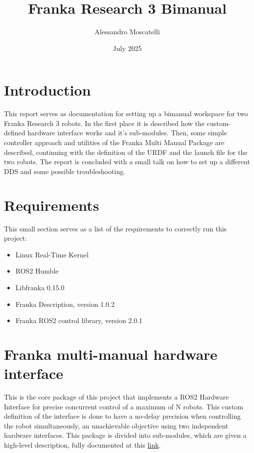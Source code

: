 \documentclass{article}
\title{Franka Research 3 Bimanual}
\author{Alessandro Moscatelli}
\date{July 2025}
\begin{document}
\maketitle

\section{Introduction}

This report serves as documentation for setting up a bimanual workspace for two Franka Research 3 robots. In the first place it is described how the custom-defined hardware interface works and it's sub-modules. Then, some simple controller approach and utilities of the Franka Multi Manual Package are described, continuing with the definition of the URDF and the launch file for the two robots. The report is concluded with a small talk on how to set up a different DDS and some possible troubleshooting.

\section{Requirements}
This small section serves as a list of the requirements to correctly run this project:
\begin{itemize}
    \item Linux Real-Time Kernel
    \item ROS2 Humble
    \item Libfranka 0.15.0
    \item Franka Description, version 1.0.2
    \item Franka ROS2 control library, version 2.0.1
\end{itemize}

\section{Franka multi-manual hardware interface}
This is the core package of this project that implements a ROS2 Hardware Interface for precise concurrent control of a maximum of N robots. This custom definition of the interface is done to have a no-delay precision when controlling the robot simultaneously, an unachievable objective using two independent hardware interfaces. This package is divided into sub-modules, which are given a high-level description, fully documented at this \href{https://idra-lab.github.io/idra-franka-launch/#doxygen}{link}. 
\end{document}
